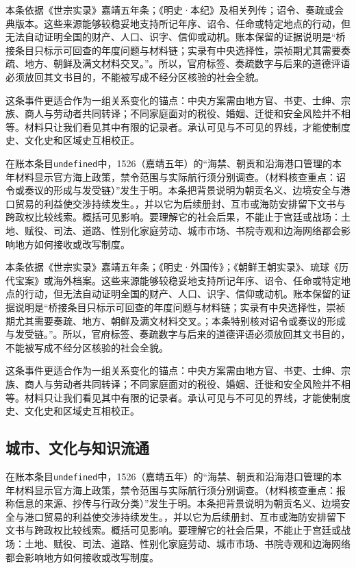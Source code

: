 本条依据《世宗实录》嘉靖五年条；《明史·本纪》及相关列传；诏令、奏疏或会典版本。这些来源能够较稳妥地支持所记年序、诏令、任命或特定地点的行动，但无法自动证明全国的财产、人口、识字、信仰或动机。账本保留的证据说明是“桥接条目只标示可回查的年度问题与材料链；实录有中央选择性，崇祯期尤其需要奏疏、地方、朝鲜及满文材料交叉。”。所以，官府标签、奏疏数字与后来的道德评语必须放回其文书目的，不能被写成不经分区核验的社会全貌。

这条事件更适合作为一组关系变化的锚点：中央方案需由地方官、书吏、士绅、宗族、商人与劳动者共同转译；不同家庭面对的税役、婚姻、迁徙和安全风险并不相等。材料只让我们看见其中有限的记录者。承认可见与不可见的界线，才能使制度史、文化史和区域史互相校正。

在账本条目\texttt{undefined}中，1526（嘉靖五年）的“海禁、朝贡和沿海港口管理的本年材料显示官方海上政策，禁令范围与实际航行须分别调查。（材料核查重点：诏令或奏议的形成与发受链）”发生于明。本条把背景说明为朝贡名义、边境安全与港口贸易的利益使交涉持续发生。，并以它为后续册封、互市或海防安排留下文书与跨政权比较线索。概括可见影响。要理解它的社会后果，不能止于宫廷或战场：土地、赋役、司法、道路、性别化家庭劳动、城市市场、书院寺观和边海网络都会影响地方如何接收或改写制度。

本条依据《世宗实录》嘉靖五年条；《明史·外国传》；《朝鲜王朝实录》、琉球《历代宝案》或海外档案。这些来源能够较稳妥地支持所记年序、诏令、任命或特定地点的行动，但无法自动证明全国的财产、人口、识字、信仰或动机。账本保留的证据说明是“桥接条目只标示可回查的年度问题与材料链；实录有中央选择性，崇祯期尤其需要奏疏、地方、朝鲜及满文材料交叉。；本条特别核对诏令或奏议的形成与发受链。”。所以，官府标签、奏疏数字与后来的道德评语必须放回其文书目的，不能被写成不经分区核验的社会全貌。

这条事件更适合作为一组关系变化的锚点：中央方案需由地方官、书吏、士绅、宗族、商人与劳动者共同转译；不同家庭面对的税役、婚姻、迁徙和安全风险并不相等。材料只让我们看见其中有限的记录者。承认可见与不可见的界线，才能使制度史、文化史和区域史互相校正。

\subsection{城市、文化与知识流通}

在账本条目\texttt{undefined}中，1526（嘉靖五年）的“海禁、朝贡和沿海港口管理的本年材料显示官方海上政策，禁令范围与实际航行须分别调查。（材料核查重点：报称信息的来源、抄传与行政分类）”发生于明。本条把背景说明为朝贡名义、边境安全与港口贸易的利益使交涉持续发生。，并以它为后续册封、互市或海防安排留下文书与跨政权比较线索。概括可见影响。要理解它的社会后果，不能止于宫廷或战场：土地、赋役、司法、道路、性别化家庭劳动、城市市场、书院寺观和边海网络都会影响地方如何接收或改写制度。

